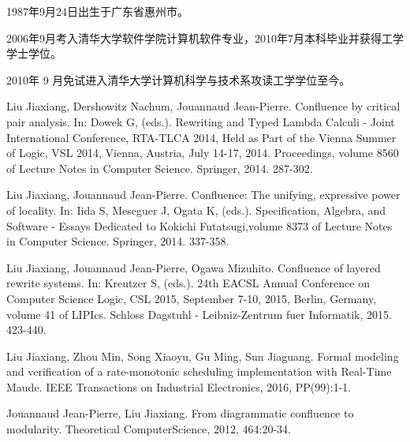 \begin{resume}


  1987年9月24日出生于广东省惠州市。

  2006年9月考入清华大学软件学院计算机软件专业，2010年7月本科毕业并获得工学学士学位。

  2010年 9 月免试进入清华大学计算机科学与技术系攻读工学学位至今。


  \begin{publications}
    \item Liu Jiaxiang, Dershowitz Nachum, Jouannaud Jean-Pierre. Confluence by critical pair
    analysis. In: Dowek G, (eds.). Rewriting and Typed Lambda Calculi - Joint 
    International Conference, RTA-TLCA 2014, Held as Part of the Vienna Summer 
    of Logic, VSL 2014, Vienna, Austria, July 14-17, 2014. Proceedings, volume 
    8560 of Lecture Notes in Computer Science. Springer, 2014. 287-302.
    \item Liu Jiaxiang, Jouannaud Jean-Pierre. Confluence: The unifying, expressive power of 
    locality. In: Iida S, Meseguer J, Ogata K, (eds.). Specification, Algebra, 
    and Software - Essays Dedicated to Kokichi Futatsugi,volume 8373 of Lecture 
    Notes in Computer Science. Springer, 2014. 337-358.
    \item Liu Jiaxiang, Jouannaud Jean-Pierre, Ogawa Mizuhito. Confluence of layered rewrite systems. 
    In: Kreutzer S, (eds.). 24th EACSL Annual Conference on Computer Science 
    Logic, CSL 2015, September 7-10, 2015, Berlin, Germany, volume 41 of 
    LIPIcs. Schloss Dagstuhl - Leibniz-Zentrum fuer Informatik, 2015. 423-440.
  \end{publications}

  \begin{publications}[before=\publicationskip,after=\publicationskip]
    \item Liu Jiaxiang, Zhou Min, Song Xiaoyu, Gu Ming, Sun Jiaguang. Formal modeling and verification of a 
    rate-monotonic scheduling implementation with Real-Time Maude. IEEE 
    Transactions on Industrial Electronics, 2016, PP(99):1-1. 
  \end{publications}

  \begin{publications}
    \item Jouannaud Jean-Pierre, Liu Jiaxiang.  From diagrammatic confluence to modularity.  
    Theoretical ComputerScience, 2012, 464:20-34.
  \end{publications}


\end{resume}
